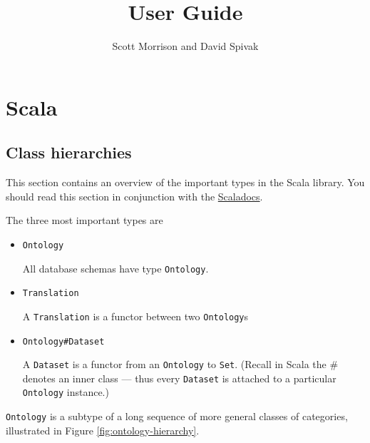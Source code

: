 \documentclass{amsart}
\title{User Guide}
\author{Scott Morrison and David Spivak}
\newcommand{\type}[1]{{\tt #1}}
\begin{document}
\maketitle

\section{Scala}

\subsection{Class hierarchies}
This section contains an overview of the important types in the Scala library. You should read this section in conjunction with the \href{}{Scaladocs}.

The three most important types are
\begin{itemize}
\item {\color{gray}\type{net.metaphor.api.}}\type{Ontology}

All database schemas have type \type{Ontology}. 

\item {\color{gray}\type{net.metaphor.api.}}\type{Translation}

A \type{Translation} is a functor between two \type{Ontology}s

\item {\color{gray}\type{net.metaphor.api.}}\type{Ontology\#Dataset}

A \type{Dataset} is a functor from an \type{Ontology} to \type{Set}. 
(Recall in Scala the \# denotes an inner class --- thus every \type{Dataset} is attached to a particular \type{Ontology} instance.) 
\end{itemize}

\type{Ontology} is a subtype of a long sequence of more general classes of categories, illustrated in Figure \ref{fig:ontology-hierarchy}.

\end{document}
